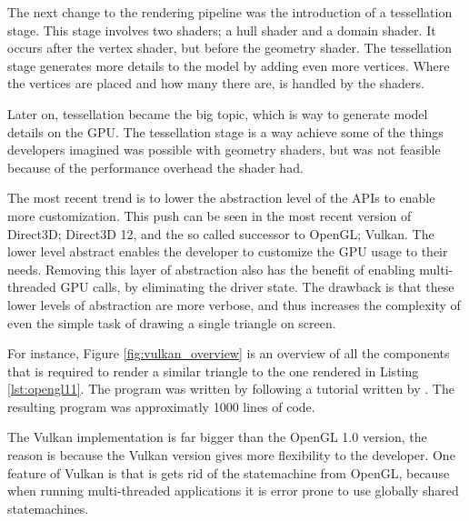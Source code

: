 The next change to the rendering pipeline was the introduction of a tessellation stage.
This stage involves two shaders; a hull shader and a domain shader.
It occurs after the vertex shader, but before the geometry shader.
The tessellation stage generates more details to the model by adding even more vertices.
Where the vertices are placed and how many there are, is handled by the shaders.

Later on, tessellation became the big topic, which is way to generate model details on the \gls{GPU}.
The tessellation stage is a way achieve some of the things developers imagined was possible with geometry shaders, but was not feasible because of the performance overhead the shader had.

The most recent trend is to lower the abstraction level of the \glspl{API} to enable more customization.
This push can be seen in the most recent version of Direct3D; Direct3D 12, and the so called successor to OpenGL; Vulkan.
The lower level abstract enables the developer to customize the \gls{GPU} usage to their needs.
Removing this layer of abstraction also has the benefit of enabling multi-threaded \gls{GPU} calls, by eliminating the driver state.
The drawback is that these lower levels of abstraction are more verbose, and thus increases the complexity of even the simple task of drawing a single triangle on screen.

For instance, Figure \ref{fig:vulkan_overview} is an overview of all the components that is required to render a similar triangle to the one rendered in Listing \ref{lst:opengl11}.
The program was written by following a tutorial written by \citet{overvoorde2017vulkan}.
The resulting program was approximatly 1000 lines of code.


The Vulkan implementation is far bigger than the OpenGL 1.0 version, the reason is because the Vulkan version gives more flexibility to the developer.
One feature of Vulkan is that is gets rid of the statemachine from OpenGL, because when running multi-threaded applications it is error prone to use globally shared statemachines.
